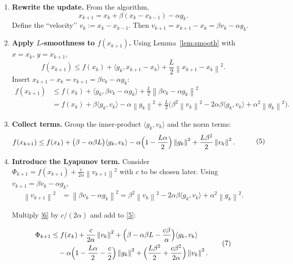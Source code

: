 \documentclass{article}
\newcommand{\norm}[1]{\left\|#1\right\|}
\begin{document}
\begin{enumerate}
\item[Step 1.] \textbf{Rewrite the update.}  
From the algorithm,
\[
x_{k+1}=x_k+\beta(x_k-x_{k-1})-\alpha g_k .
\tag{2}
\]
Define the “velocity’’ $v_k:=x_k-x_{k-1}$. Then $v_{k+1}=x_{k+1}-x_k = \beta v_k-\alpha g_k$.
\item[Step 2.] \textbf{Apply $L$‑smoothness to $f(x_{k+1})$.}  
Using Lemma~\ref{lem:smooth} with $x=x_k$, $y=x_{k+1}$,
\[
f(x_{k+1})\le f(x_k)+\langle g_k, x_{k+1}-x_k\rangle+\frac{L}{2}\norm{x_{k+1}-x_k}^{2}.
\tag{3}
\]
Insert $x_{k+1}-x_k=v_{k+1}=\beta v_k-\alpha g_k$:
\[
\begin{aligned}
f(x_{k+1}) &\le f(x_k)+\langle g_k,\beta v_k-\alpha g_k\rangle
               +\frac{L}{2}\norm{\beta v_k-\alpha g_k}^{2}\\
&= f(x_k)+\beta\langle g_k,v_k\rangle-\alpha\norm{g_k}^{2}
   +\frac{L}{2}\bigl(\beta^{2}\norm{v_k}^{2}
          -2\alpha\beta\langle g_k,v_k\rangle+\alpha^{2}\norm{g_k}^{2}\bigr).
\end{aligned}
\tag{4}
\]

\item[Step 3.] \textbf{Collect terms.}  
Group the inner‑product $\langle g_k,v_k\rangle$ and the norm terms:
\[
\begin{aligned}
f(x_{k+1}) &\le f(x_k)
   +\bigl(\beta-\alpha\beta L\bigr)\langle g_k,v_k\rangle
   -\alpha\Bigl(1-\frac{L\alpha}{2}\Bigr)\norm{g_k}^{2}
   +\frac{L\beta^{2}}{2}\norm{v_k}^{2}.
\end{aligned}
\tag{5}
\]

\item[Step 4.] \textbf{Introduce the Lyapunov term.}  
Consider $\Phi_{k+1}=f(x_{k+1})+\frac{c}{2\alpha}\norm{v_{k+1}}^{2}$ with $c$ to be chosen later.
Using $v_{k+1}= \beta v_k-\alpha g_k$,
\[
\begin{aligned}
\norm{v_{k+1}}^{2}
   &=\norm{\beta v_k-\alpha g_k}^{2}
    =\beta^{2}\norm{v_k}^{2}
     -2\alpha\beta\langle g_k,v_k\rangle
     +\alpha^{2}\norm{g_k}^{2}.
\end{aligned}
\tag{6}
\]

Multiply \eqref{6} by $c/(2\alpha)$ and add to \eqref{5}:

\[
\begin{aligned}
\Phi_{k+1}
&\le f(x_k)+\frac{c}{2\alpha}\norm{v_k}^{2}
   +\Bigl(\beta-\alpha\beta L-\frac{c\beta}{\alpha}\Bigr)\langle g_k,v_k\rangle \\
&\quad -\alpha\Bigl(1-\frac{L\alpha}{2}-\frac{c}{2}\Bigr)\norm{g_k}^{2}
   +\Bigl(\frac{L\beta^{2}}{2}+\frac{c\beta^{2}}{2\alpha}\Bigr)\norm{v_k}^{2}.
\end{aligned}
\tag{7}
\]


\end{enumerate}
\end{document}
